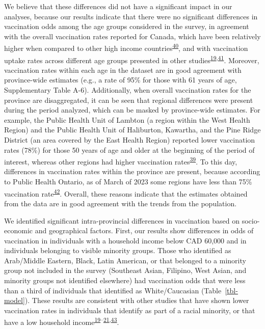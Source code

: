 \documentclass[
  letterpaper,
  DIV=11,
  numbers=noendperiod]{scrartcl}
\begin{document}
We believe that these differences did not have a significant impact in
our analyses, because our results indicate that there were no
significant differences in vaccination odds among the age groups
considered in the survey, in agreement with the overall vaccination
rates reported for Canada, which have been relatively higher when
compared to other high income
countries\textsuperscript{\protect\hyperlink{ref-dube2022}{40}}, and
with vaccination uptake rates across different age groups presented in
other
studies\textsuperscript{\protect\hyperlink{ref-guay2022}{19},\protect\hyperlink{ref-macdonald2021}{41}}.
Moreover, vaccination rates within each age in the dataset are in good
agreement with province-wide estimates (e.g., a rate of 95\% for those
with 61 years of age, Supplementary Table A-6). Additionally, when
overall vaccination rates for the province are disaggregated, it can be
seen that regional differences were present during the period analyzed,
which can be masked by province-wide estimates. For example, the Public
Health Unit of Lambton (a region within the West Health Region) and the
Public Health Unit of Haliburton, Kawartha, and the Pine Ridge District
(an area covered by the East Health Region) reported lower vaccination
rates (78\%) for those 50 years of age and older at the beginning of the
period of interest, whereas other regions had higher vaccination
rates\textsuperscript{\protect\hyperlink{ref-ontario-covid}{39}}. To
this day, differences in vaccination rates within the province are
present, because according to Public Health Ontario, as of March of 2023
some regions have less than 75\% vaccination
rate\textsuperscript{\protect\hyperlink{ref-ontario-covid-map}{42}}.
Overall, these reasons indicate that the estimates obtained from the
data are in good agreement with the trends from the population.

We identified significant intra-provincial differences in vaccination
based on socio-economic and geographical factors. First, our results
show differences in odds of vaccination in individuals with a household
income below CAD 60,000 and in individuals belonging to visible minority
groups. Those who identified as Arab/Middle Eastern, Black, Latin
American, or that belonged to a minority group not included in the
survey (Southeast Asian, Filipino, West Asian, and minority groups not
identified elsewhere) had vaccination odds that were less than a third
of individuals that identified as White/Caucasian
(Table~\ref{tbl-model}). These results are consistent with other studies
that have shown lower vaccination rates in individuals that identify as
part of a racial minority, or that have a low household
income\textsuperscript{\protect\hyperlink{ref-guay2022}{19}--\protect\hyperlink{ref-hussain2022}{21},\protect\hyperlink{ref-carter2022}{43}}.
\end{document}
